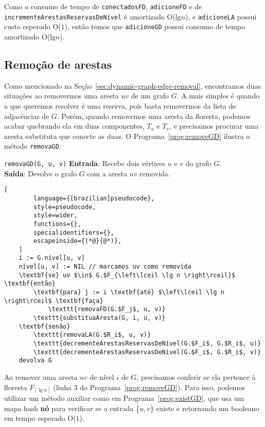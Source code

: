 Como o consumo de tempo de \texttt{conectadosFD}, \texttt{adicioneFD} e de \texttt{incrementeArestasReservasDeNível} é amortizado O(lg$n$), e \texttt{adicioneLA} possui custo esperado O($1$), então temos que \texttt{adicioneGD} possui consumo de tempo amortizado O(lg$n$).

\subsection{Remoção de arestas}
\label{sec:code-edge-removal}

Como mencionado na Seção~\ref{sec:dynamic-graph-edge-removal}, encontramos duas situações ao removermos uma aresta $uv$ de um grafo $G$. A mais simples é quando a que queremos resolver é uma reserva, pois basta removermos da lista de adjacências de $G$. Porém, quando removemos uma aresta da floresta, podemos acabar quebrando ela em duas componentes, $T_u$ e $T_v$, e precisamos procurar uma aresta substituta que conecte as duas. O Programa~\ref{prog:removeGD} ilustra o método \texttt{removaGD}.

\begin{programruledcaption}{\texttt{removaGD(G, u, v)} \label{prog:removeGD}}
    \noindent\textbf{Entrada}: Recebe dois vértices $u$ e $v$ do grafo $G$. \\
    \textbf{Saída}: Devolve o grafo $G$ com a aresta $uv$ removida.
    \vspace{-0.5\baselineskip}
    \begin{lstlisting}[
        language={[brazilian]pseudocode},
        style=pseudocode,
        style=wider,
        functions={},
        specialidentifiers={},
        escapeinside={(*@}{@*)},
    ]
    i := G.nível[u, v]
    nível[u, v] := NIL // marcamos uv como removida
    \textbf{se} uv $\in$ G.$F_{\left\lceil \lg n \right\rceil}$ \textbf{então}
        \textbf{para} j := i \textbf{até} $\left\lceil \lg n \right\rceil$ \textbf{faça}
            \texttt{removaFD(G.$F_j$, u, v)}
        \texttt{substituaAresta(G, i, u, v)}
    \textbf{senão}
        \texttt{removaLA(G.$R_i$, u, v)}
        \texttt{decrementeArestasReservasDeNível(G.$F_i$, G.$R_i$, u)}
        \texttt{decrementeArestasReservasDeNível(G.$F_i$, G.$R_i$, v)}
    devolva G
    \end{lstlisting}
    \vspace{-0.5\baselineskip}
\end{programruledcaption}

Ao remover uma aresta $uv$ de nível $i$ de $G$, precisamos conferir se ela pertence à floresta $F_{\left\lceil \lg n \right\rceil}$ (linha $3$ do Programa~\ref{prog:removeGD}). Para isso, podemos utilizar um método auxiliar como em Programa~\ref{prog:existGD}, que usa um mapa hash \textbf{nó} para verificar se a entrada \{$u, v$\} existe e retornando um booleano em tempo esperado O($1$).


